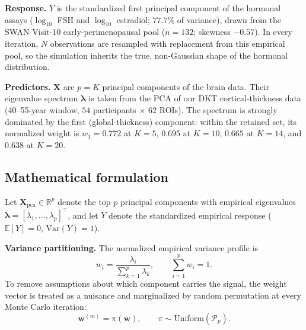 \documentclass[11pt,a4paper]{article}
\begin{document}
\textbf{Response.} $Y$ is the standardized first principal component of the hormonal assays ($\log_{10}$ FSH and $\log_{10}$ estradiol; $77.7\%$ of variance), drawn from the SWAN Visit-10 early-perimenopausal pool ($n=132$; skewness $-0.57$). In every iteration, $N$ observations are resampled with replacement from this empirical pool, so the simulation inherits the true, non-Gaussian shape of the hormonal distribution.

\textbf{Predictors.} $\mathbf{X}$ are $p=K$ principal components of the brain data. Their eigenvalue spectrum $\bm\lambda$ is taken from the PCA of our DKT cortical-thickness data (40--55-year window, $54$ participants $\times$ 62 ROIs). The spectrum is strongly dominated by the first (global-thickness) component: within the retained set, its normalized weight is $w_1=0.772$ at $K=5$, $0.695$ at $K=10$, $0.665$ at $K=14$, and $0.638$ at $K=20$.

\subsection{Mathematical formulation}

Let $\mathbf{X}_{\mathrm{pca}}\in\mathbb{R}^{p}$ denote the top $p$ principal components with empirical eigenvalues $\bm\lambda=[\lambda_1,\dots,\lambda_p]^{\top}$, and let $Y$ denote the standardized empirical response ($\mathbb{E}[Y]=0$, $\mathrm{Var}(Y)=1$).

\textbf{Variance partitioning.} The normalized empirical variance profile is
\begin{equation}
w_i=\frac{\lambda_i}{\sum_{k=1}^{p}\lambda_k},\qquad \sum_{i=1}^{p}w_i=1 .
\end{equation}
To remove assumptions about which component carries the signal, the weight vector is treated as a nuisance and marginalized by random permutation at every Monte Carlo iteration:
\begin{equation}
\mathbf{w}^{(m)}=\pi(\mathbf{w}),\qquad \pi\sim\mathrm{Uniform}(\mathcal{P}_p).
\end{equation}
\end{document}
